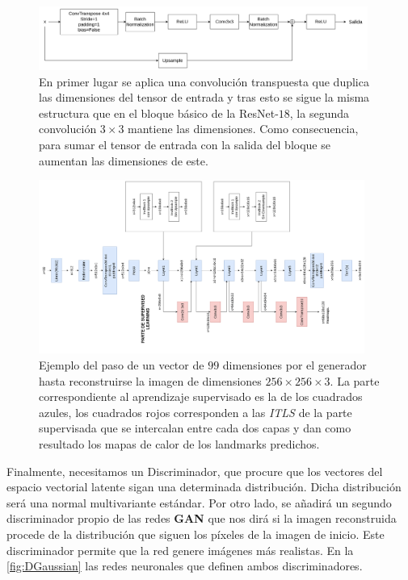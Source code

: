             \begin{figure}[H]
                \centering
                \includegraphics[width=0.96\textwidth]{img/bloque_invresnet.png}
                \caption{En primer lugar se aplica una convolución transpuesta que duplica las dimensiones del tensor de entrada y tras esto se sigue la misma estructura que en el bloque básico de la ResNet-$18$, la segunda convolución $3\times 3$ mantiene las dimensiones. Como consecuencia, para sumar el tensor de entrada con la salida del bloque se aumentan las dimensiones de este.}
                \label{fig:Bloque_Decoder}
            \end{figure}

            \begin{figure}[H]
                \centering
                \includegraphics[width=0.95\textwidth]{img/paso_generator.png}
                \caption{Ejemplo del paso de un vector de $99$ dimensiones por el generador hasta reconstruirse la imagen de dimensiones $256 \times 256 \times 3$. La parte correspondiente al aprendizaje supervisado es la de los cuadrados azules, los cuadrados rojos corresponden a las \textit{ITLS} de la parte supervisada que se intercalan entre cada dos capas y dan como resultado los mapas de calor de los landmarks predichos.}
                \label{fig:Paso_Generator}
            \end{figure}

            \noindent Finalmente, necesitamos un Discriminador, que procure que los vectores del espacio vectorial latente sigan una determinada distribución. Dicha distribución será una normal multivariante estándar. Por otro lado, se añadirá un segundo discriminador propio de las redes \textbf{GAN} que nos dirá si la imagen reconstruida procede de la distribución que siguen los píxeles de la imagen de inicio. Este discriminador permite que la red genere imágenes más realistas. En la \autoref{fig:DGaussian} las redes neuronales que definen ambos discriminadores.

